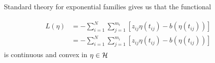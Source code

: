 \documentclass[../chapter-2-spline-representation.tex]{subfiles}
\begin{document}
\bigskip

Standard theory for exponential families gives us that the functional 

\begin{align}
\begin{split}
L\left( \eta \right) &= -\sum_{i=1}^N \sum_{j=1}^{m_i} \left[ z_{ij} \eta\left(t_{ij}\right) - b\left(\eta\left(t_{ij}\right)\right) \right] \\
&= -\sum_{i=1}^N \sum_{j=1}^{m_i} \left[ z_{ij} \eta\left(t_{ij}\right) - b\left(\eta\left(t_{ij}\right)\right) \right]
\end{split}
\end{align}
\noindent
is continuous and convex in $\eta \in \mathcal{H}$
\end{document}
